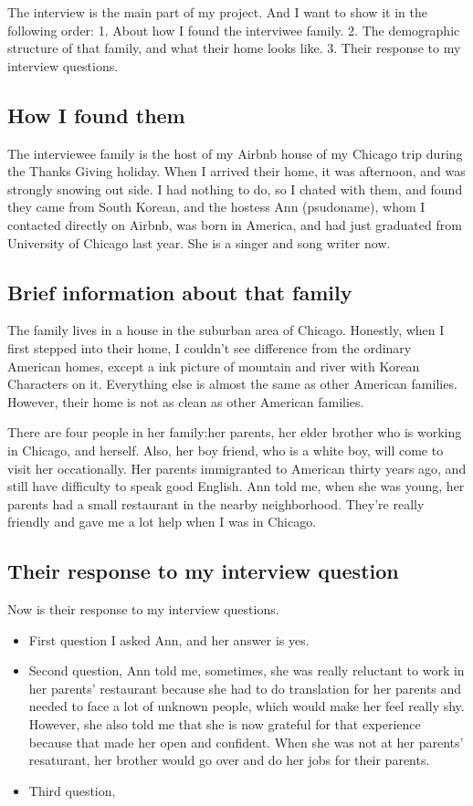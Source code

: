 The interview is the main part of my project. And I want to show it in the
following order: 1. About how I found the interviwee family. 2. The demographic
structure of that family, and what their home looks like. 3. Their response to
my interview questions.
\subsection{How I found them}
The interviewee family is the host of my Airbnb house of my Chicago trip during
the Thanks Giving holiday. When I arrived their home, it was afternoon, and was
strongly snowing out side. I had nothing to do, so I chated with them, and found
they came from South Korean, and the hostess Ann (psudoname), whom I contacted
directly on Airbnb, was born in America, and had just graduated from 
University of Chicago last year. She is a singer and song writer now.
\subsection{Brief information about that family}
The family lives in a house in the suburban area of Chicago. Honestly, when I
first stepped into their home, I couldn't see difference from the ordinary
American homes, except a ink picture of mountain and river with Korean
Characters on it. Everything else is almost the same as other American
families. However, their home is not as clean as other American families. 
\par
There are four people in her family:her parents, her elder brother who is
working in Chicago, and herself. Also, her boy friend, who is a white boy, will
come to visit her occationally. Her parents immigranted to American thirty years
ago, and still have difficulty to speak good English. Ann told
me, when she was young, her parents had a small restaurant in the nearby
neighborhood. They're really friendly and gave me a lot help when I was in
Chicago.
\subsection{Their response to my interview question}
Now is their response to my interview questions.
\begin{itemize}
  \item First question I asked Ann, and her answer is yes.
  \item Second question, Ann told me, sometimes, she was really reluctant to
  work in her parents' restaurant because she had to do translation for her
  parents and needed to face a lot of unknown people, which would make her feel
  really shy. However, she also told me that she is now grateful for that
  experience because that made her open and confident. When she was not at her
  parents' resaturant, her brother would go over and do her jobs for their
  parents.
  \item Third question, 
\end{itemize}